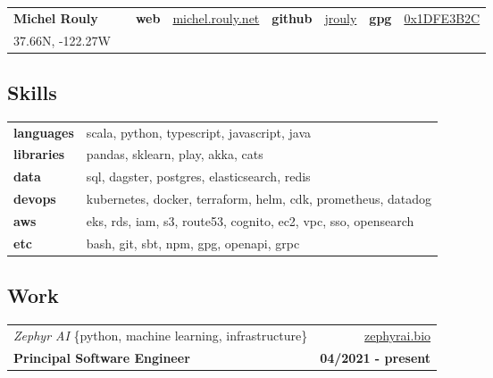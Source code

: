 \documentclass[10pt,letterpaper]{article}
\begin{document}
\setcounter{secnumdepth}{0}

\noindent
\begin{tabularx}{\textwidth}{@{} lXllllll @{}}
  {\Large\textbf{Michel Rouly}}
  &
  & \textbf{web}
  & \href{https://michel.rouly.net}{michel.rouly.net}
  & \textbf{github}
  & \href{https://github.com/jrouly}{jrouly}
  & \textbf{gpg}
  & \href{https://keyserver.ubuntu.com/pks/lookup?search=0x1DFE3B2C\&fingerprint=on\&op=index}{0x1DFE3B2C} \\

  {37.66N, -122.27W}
  &
  &
  &
  &
  &
  &
  &
\end{tabularx}

\subsection{Skills}

\noindent
\begin{tabularx}{\textwidth}{@{} lX @{}}
  \textbf{languages} & scala, python, typescript, javascript, java \\
  \textbf{libraries} & pandas, sklearn, play, akka, cats \\
  \textbf{data} & sql, dagster, postgres, elasticsearch, redis \\
  \textbf{devops} & kubernetes, docker, terraform, helm, cdk, prometheus, datadog \\
  \textbf{aws} & eks, rds, iam, s3, route53, cognito, ec2, vpc, sso, opensearch \\
  \textbf{etc} & bash, git, sbt, npm, gpg, openapi, grpc
\end{tabularx}

\subsection{Work}

\noindent\begin{tabularx}{\textwidth}{@{} Xr @{}}
  \textit{Zephyr AI} \{python, machine learning, infrastructure\} & \href{https://zephyrai.bio}{zephyrai.bio} \\
  \textbf{Principal Software Engineer} & \textbf{04/2021 - present} \\
\end{tabularx}
\end{document}
